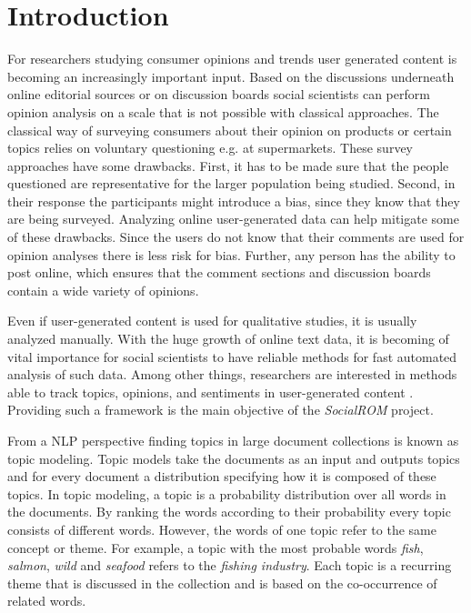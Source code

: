%
\chapter{Introduction}

For researchers studying consumer opinions and trends user generated content is becoming an increasingly important input. Based on the discussions underneath online editorial sources or on discussion boards social scientists can perform opinion analysis on a scale that is not possible with classical approaches.
The classical way of surveying consumers about their opinion on products or certain topics relies on voluntary questioning e.g. at supermarkets. These survey approaches have some drawbacks. First, it has to be made sure that the people questioned are representative for the larger population being studied. Second, in their response the participants might introduce a bias, since they know that they are being surveyed. Analyzing online user-generated data can help mitigate some of these drawbacks. Since the users do not know that their comments are used for opinion analyses there is less risk for bias. Further, any person has the ability to post online, which ensures that the comment sections and discussion boards contain a wide variety of opinions.

Even if user-generated content is used for qualitative studies, it is usually analyzed manually. With the huge growth of online text data, it is becoming of vital importance for social scientists to have reliable methods for fast automated analysis of such data. Among other things, researchers are interested in methods able to track topics, opinions, and sentiments in user-generated content \citep{Nikolenko2017}. Providing such a framework is the main objective of the \textit{SocialROM} project.

From a \ac{NLP} perspective finding topics in large document collections is known as topic modeling. Topic models take the documents as an input and outputs topics and for every document a distribution specifying how it is composed of these topics. In topic modeling, a topic is a probability distribution over all words in the documents. By ranking the words according to their probability every topic consists of different words. However, the words of one topic refer to the same concept or theme. For example, a topic with the most probable words \textit{fish}, \textit{salmon}, \textit{wild} and \textit{seafood} refers to the \textit{fishing industry}. Each topic is a recurring theme that is discussed in the collection and is based on the co-occurrence of related words.

